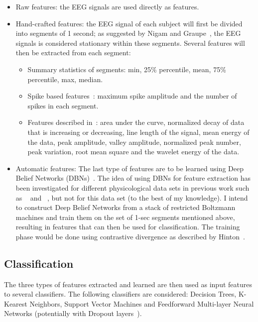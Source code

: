 \documentclass[12pt]{article}
\begin{document}
\begin{itemize}

\item Raw features: the EEG signals are used directly as features.

\item Hand-crafted features: the EEG signal of each subject will first be divided into segments of 1 second; as suggested by Nigam and Graupe~\cite{nigam2004neural}, the EEG signals is considered stationary within these segments. Several features will then be extracted from each segment:
      \begin{itemize}
      \item Summary statistics of segments: min, 25\% percentile, mean, 75\% percentile, max, median.
      \item Spike based features~\cite{nigam2004neural}: maximum spike amplitude and the number of spikes in each segment.
      \item Features described in~\cite{wulsin2011modeling}: area under the curve, normalized decay of data that is increasing or decreasing, line length of the signal, mean energy of the data, peak amplitude, valley amplitude, normalized peak number, peak variation, root mean square and the wavelet energy of the data.
      \end{itemize}

\item Automatic features: The last type of features are to be learned using Deep Belief Networks (DBNs)~\cite{hinton2006reducing}. The idea of using DBNs for feature extraction has been investigated for different physicological data sets in previous work such as ~\cite{langkvist2012sleep} and ~\cite{wulsin2011modeling}, but not for this data set (to the best of my knowledge). I intend to construct Deep Belief Networks from a stack of restricted Boltzmann machines and train them on the set of 1-sec segments mentioned above, resulting in features that can then be used for classification. The training phase would be done using contrastive divergence as described by Hinton~\cite{hinton2006training}.

\end{itemize}

\subsection{Classification}

The three types of features extracted and learned are then used as input features to several classifiers. The following classifiers are considered: Decision Trees, K-Kearest Neighbors, Support Vector Machines and Feedforward Multi-layer Neural Networks (potentially with Dropout layers~\cite{srivastava2014dropout}).
\end{document}
